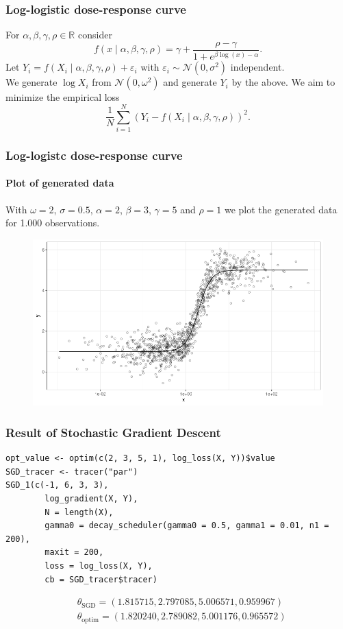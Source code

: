 \documentclass[aspectratio=169]{beamer}
\begin{document}
\begin{frame}
    \frametitle{Log-logistic dose-response curve}
    For $\alpha,\beta,\gamma,\rho\in\mathbb{R}$ consider
    \begin{equation}
        f(x\mid\alpha,\beta,\gamma,\rho)=\gamma + \frac{\rho - \gamma}{1 + e^{\beta\log(x)-\alpha}}.
    \end{equation}
    Let $Y_{i}=f(X_{i}\mid\alpha,\beta,\gamma,\rho)+\varepsilon_{i}$ with $\varepsilon_{i}\sim\mathcal{N}(0,\sigma^{2})$ independent.\\[12pt]
    We generate $\log X_{i}$ from $\mathcal{N}(0,\omega^{2})$ and generate $Y_{i}$ by the above. We aim to minimize the empirical loss
    \begin{equation}
        \frac{1}{N}\sum_{i=1}^{N}(Y_{i}-f(X_{i}\mid\alpha,\beta,\gamma,\rho))^{2}.
    \end{equation}
\end{frame}
\begin{frame}
    \frametitle{Log-logistc dose-response curve}
    \framesubtitle{Plot of generated data}
    With $\omega = 2$, $\sigma = 0.5$, $\alpha = 2$, $\beta = 3$, $\gamma = 5$ and $\rho = 1$ we plot the generated data for 1.000 observations.
    \begin{figure}
        \centering
        \includegraphics[scale = 0.4]{figure/dataplot.png}
    \end{figure}
\end{frame}
\begin{frame}[fragile]
    \frametitle{Result of Stochastic Gradient Descent}
\begin{verbatim}
opt_value <- optim(c(2, 3, 5, 1), log_loss(X, Y))$value
SGD_tracer <- tracer("par")
SGD_1(c(-1, 6, 3, 3), 
        log_gradient(X, Y),
        N = length(X),
        gamma0 = decay_scheduler(gamma0 = 0.5, gamma1 = 0.01, n1 = 200),
        maxit = 200,
        loss = log_loss(X, Y),
        cb = SGD_tracer$tracer)
\end{verbatim}
    \begin{align*}
        &\theta_{\text{SGD}}=(1.815715, 2.797085, 5.006571, 0.959967) \\
        &\theta_{\text{optim}}=(1.820240, 2.789082, 5.001176, 0.965572)
    \end{align*}
\end{frame}
\end{document}

